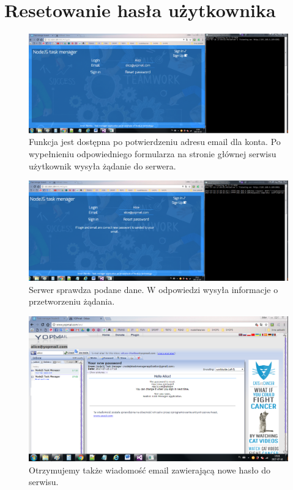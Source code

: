 \documentclass[12pt]{report}
\begin{document}
\section{Resetowanie hasła użytkownika}
\begin{figure}[!hb]
\centering
\includegraphics[width=\textwidth,height=\textheight,keepaspectratio]{51.png}
\captionsetup{labelformat=empty}
\caption[]{Funkcja jest dostępna po potwierdzeniu adresu email dla konta. 
Po wypełnieniu odpowiedniego formularza na stronie głównej serwisu użytkownik wysyła żądanie do serwera.}
\end{figure}
\begin{figure}[!hb]
\centering
\includegraphics[width=\textwidth,height=\textheight,keepaspectratio]{52.png}
\captionsetup{labelformat=empty}
\caption[]{Serwer sprawdza podane dane. W odpowiedzi wysyła informacje o przetworzeniu żądania.}
\end{figure}
\begin{figure}[!hb]
\centering
\includegraphics[width=\textwidth,height=\textheight,keepaspectratio]{53.png}
\captionsetup{labelformat=empty}
\caption[]{Otrzymujemy także wiadomość email zawierającą nowe hasło do serwisu.}
\end{figure}
\end{document}
